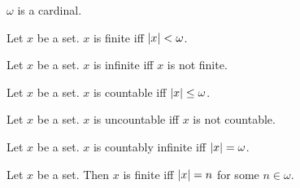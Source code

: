 \documentclass[../set-theory.tex]{subfiles}
\begin{document}
  \begin{forthel}
    \begin{corollary}
      $\omega$ is a cardinal.
    \end{corollary}
  \end{forthel}

  \begin{forthel}
    \begin{definition}
      Let $x$ be a set.
      $x$ is finite iff $\left\vert x\right\vert < \omega$.
    \end{definition}
  \end{forthel}

  \begin{forthel}
    \begin{definition}
      Let $x$ be a set.
      $x$ is infinite iff $x$ is not finite.
    \end{definition}
  \end{forthel}

  \begin{forthel}
    \begin{definition}
      Let $x$ be a set.
      $x$ is countable iff $\left\vert x\right\vert \leq \omega$.
    \end{definition}
  \end{forthel}

  \begin{forthel}
    \begin{definition}
      Let $x$ be a set.
      $x$ is uncountable iff $x$ is not countable.
    \end{definition}
  \end{forthel}

  \begin{forthel}
    \begin{definition}
      Let $x$ be a set.
      $x$ is countably infinite iff $\left\vert x\right\vert = \omega$.
    \end{definition}
  \end{forthel}

  \begin{forthel}
    \begin{proposition}
      Let $x$ be a set.
      Then $x$ is finite iff $\left\vert x\right\vert = n$ for some $n \in \omega$.
    \end{proposition}
  \end{forthel}
\end{document}
